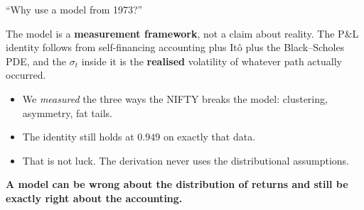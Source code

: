 \documentclass[aspectratio=169,11pt]{beamer}
\newcommand{\lead}[1]{{\sffamily\bfseries\color{accent}#1}}
\begin{document}
\begin{frame}{``Why use a model from 1973?''}
\begin{inknote}
The model is a \textbf{measurement framework}, not a claim about reality. The P\&L identity
follows from self-financing accounting plus It\^o plus the Black--Scholes PDE, and the
$\sigma_t$ inside it is the \textbf{realised} volatility of whatever path actually occurred.
\end{inknote}
\vspace{0.7em}
\begin{itemize}
  \item We \emph{measured} the three ways the NIFTY breaks the model: clustering, asymmetry,
        fat tails.
  \item The identity still holds at $0.949$ on exactly that data.
  \item That is not luck. The derivation never uses the distributional assumptions.
\end{itemize}
\vspace{0.7em}
\lead{A model can be wrong about the distribution of returns and still be exactly right about
the accounting.}
\end{frame}
\end{document}

